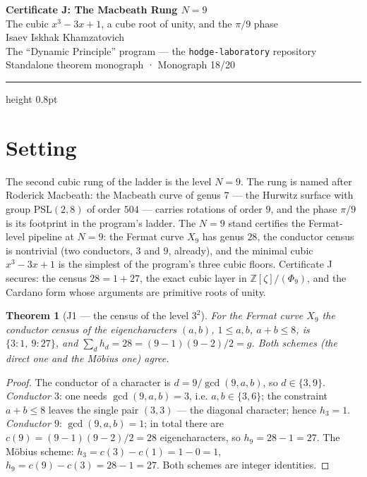 \documentclass[11pt,a4paper]{article}
\theoremstyle{plain}
\newtheorem{theorem}{Theorem}
\theoremstyle{definition}
\theoremstyle{remark}
\newcommand{\ZZ}{\mathbb{Z}}
\begin{document}
\begin{center}
{\LARGE\bfseries Certificate J: The Macbeath Rung $N=9$}\\[0.4em]
{\large The cubic $x^3-3x+1$, a cube root of unity, and the $\pi/9$ phase}\\[0.6em]
{\normalsize Isaev Iskhak Khamzatovich}\\[0.2em]
{\small The ``Dynamic Principle'' program --- the \texttt{hodge-laboratory} repository}\\[0.15em]
{\small Standalone theorem monograph · Monograph 18/20}
\end{center}
\vspace{0.4em}
{\color{linkblue}\hrule height 0.8pt}
\vspace{0.8em}

\section{Setting}

The second cubic rung of the ladder is the level $N=9$. The rung
is named after Roderick Macbeath: the Macbeath curve of genus $7$
--- the Hurwitz surface with group $\mathrm{PSL}(2,8)$ of order
$504$ --- carries rotations of order $9$, and the phase $\pi/9$
is its footprint in the program's ladder. The $N=9$ stand
certifies the Fermat-level pipeline at $N=9$: the Fermat curve
$X_9$ has genus $28$, the conductor census is nontrivial (two
conductors, $3$ and $9$, already), and the minimal cubic
$x^3-3x+1$ is the simplest of the program's three cubic floors.
Certificate J secures: the census $28=1+27$, the exact cubic
layer in $\ZZ[\zeta]/(\Phi_9)$, and the Cardano form whose
arguments are primitive roots of unity.

\begin{theorem}[J1 --- the census of the level $3^2$]\label{th:J1}
For the Fermat curve $X_9$ the conductor census of the
eigencharacters $(a,b)$, $1\le a,b$, $a+b\le 8$, is
$\{3\colon 1,\ 9\colon 27\}$, and $\sum_d h_d = 28
= (9-1)(9-2)/2 = g$. Both schemes (the direct one and the
M\"obius one) agree.
\end{theorem}

\begin{proof}
The conductor of a character is $d=9/\gcd(9,a,b)$, so
$d\in\{3,9\}$. \emph{Conductor $3$}: one needs
$\gcd(9,a,b)=3$, i.e. $a,b\in\{3,6\}$; the constraint
$a+b\le 8$ leaves the single pair $(3,3)$ --- the diagonal
character; hence $h_3=1$. \emph{Conductor $9$}: $\gcd(9,a,b)=1$;
in total there are $c(9)=(9-1)(9-2)/2=28$ eigencharacters, so
$h_9=28-1=27$. The M\"obius scheme: $h_3=c(3)-c(1)=1-0=1$,
$h_9=c(9)-c(3)=28-1=27$. Both schemes are integer identities.
\end{proof}
\end{document}

